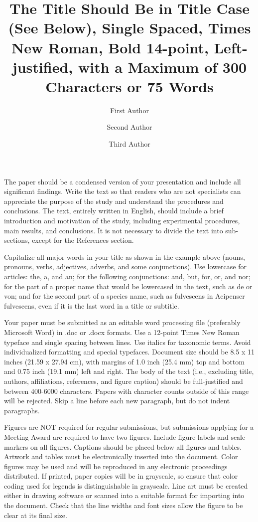 \documentclass[12pt]{article}
\author[1]{First Author}
\author[2,*]{Second Author}
\author[1,3]{Third Author}
\affil[1]{Affiliation of the first author, Department/Institution, City, State/Province, Country.}
\affil[2]{Affiliation of the second author, Department/Institution, City, State/Province, Country.}
\affil[3]{Department of History, University of Illinois – Urbana-Champaign, Urbana, IL, United States.}
\affil[*]{Corresponding author: SAuthor@prydonian.edu }
\date{\vspace{-5em}}
\title{\vspace{-1.5em}The Title Should Be in Title Case (See Below), Single Spaced, Times New Roman, Bold 14-point, Left-justified, with a Maximum of 300 Characters or 75 Words{\vspace{-0.7em}}}
\begin{document}
	
\maketitle

The paper should be a condensed version of your presentation and include all significant findings. Write the text so that readers who are not specialists can appreciate the purpose of the study and understand the procedures and conclusions. The text, entirely written in English, should include a brief introduction and motivation of the study, including experimental procedures, main results, and conclusions. It is not necessary to divide the text into sub-sections, except for the References section.

Capitalize all major words in your title as shown in the example above (nouns, pronouns, verbs, adjectives, adverbs, and some conjunctions). Use lowercase for articles: the, a, and an; for the following conjunctions: and, but, for, or, and nor; for the part of a proper name that would be lowercased in the text, such as de or von; and for the second part of a species name, such as fulvescens in Acipenser fulvescens, even if it is the last word in a title or subtitle.

Your paper must be submitted as an editable word processing file (preferably Microsoft Word) in .doc or .docx formats. Use a 12-point Times New Roman typeface and single spacing between lines. Use italics for taxonomic terms. Avoid individualized formatting and special typefaces. Document size should be 8.5 x 11 inches (21.59 x 27.94 cm), with margins of 1.0 inch (25.4 mm) top and bottom and 0.75 inch (19.1 mm) left and right. The body of the text (i.e., excluding title, authors, affiliations, references, and figure caption) should be full-justified and between 400-6000 characters. Papers with character counts outside of this range will be rejected. Skip a line before each new paragraph, but do not indent paragraphs. 

Figures are NOT required for regular submissions, but submissions applying for a Meeting Award are required to have two figures. Include figure labels and scale markers on all figures. Captions should be placed below all figures and tables. Artwork and tables must be electronically inserted into the document. Color figures may be used and will be reproduced in any electronic proceedings distributed. If printed, paper copies will be in grayscale, so ensure that color coding used for legends is distinguishable in grayscale. Line art must be created either in drawing software or scanned into a suitable format for importing into the document. Check that the line widths and font sizes allow the figure to be clear at its final size.
\end{document}
